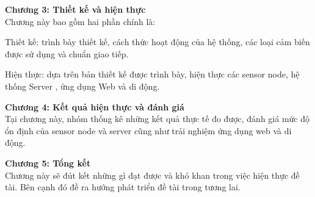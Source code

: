\textbf{Chương 3: Thiết kế và hiện thực}\\
Chương này bao gồm hai phần chính là:

Thiết kế: trình bày thiết kế, cách thức hoạt động của hệ thống, các loại cảm biến được sử dụng và chuẩn giao tiếp.

Hiện thực: dựa trên bản thiết kế được trình bày, hiện thực các sensor node, hệ thống Server , ứng dụng Web và di động.

\textbf{Chương 4: Kết quả hiện thực và đánh giá}\\
Tại chương này, nhóm thống kê những kết quả thực tế đo được, đánh giá mức độ ổn định của sensor node và server cũng như trải nghiệm ứng dụng web và di động.

\textbf{Chương 5: Tổng kết}\\

Chương này sẽ đút kết những gì đạt được và khó khan trong việc hiện thực đề tài. Bên cạnh đó đề ra hướng phát triển đề tài trong tương lai.